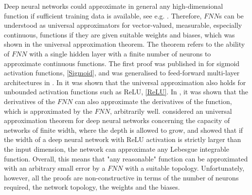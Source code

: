Deep neural networks could approximate in general any high-dimensional function if sufficient training data is available, see e.g. \cite{ArzaniDawson:2021}. Therefore, $FNN$s can be understood as universal approximators for vector-valued, measurable, especially continuous, functions if they are given suitable weights and biases, which was shown in the universal approximation theorem. The theorem refers to the ability of $FNN$ with a single hidden layer with a finite number of neurons to approximate continuous functions. The first proof was published in \cite{Cybenko:1989} for sigmoid activation functions, \cref{Sigmoid}, and was generalised to feed-forward multi-layer architectures in \cite{Hornik:1991}. In \cite{SonodaMurata:2017} it was shown that the universal approximation also holds for unbounded activation functions such as ReLU, \cref{ReLU}. In \cite{HornikStinchcombeWhite:1990}, it was shown that the derivatives of the $FNN$ can also approximate the derivatives of the function, which is approximated by the $FNN$, arbitrarily well. \cite{LuPuWangHuWang:2017} considered an universal approximation theorem for deep neural networks concerning the capacity of networks of finite width, where the depth is allowed to grow, and showed that if the width of a deep neural network with ReLU activation is strictly larger than the input dimension, the network can approximate any Lebesgue integrable function. Overall, this means that "any reasonable" function can be approximated with an arbitrary small error by a $FNN$ with a suitable topology. Unfortunately, however, all the proofs are non-constructive in terms of the number of neurons required, the network topology, the weights and the biases. \\


